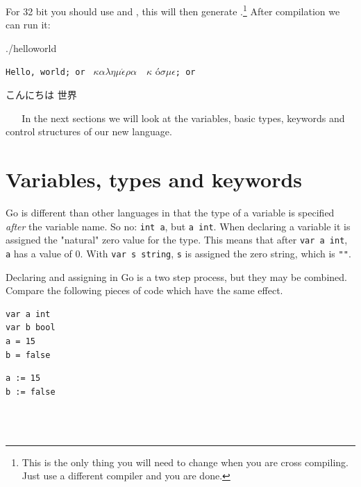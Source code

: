 For 32 bit you should use  and , this will then
generate .\footnote{This is the only thing you will
need to change when you are cross compiling. Just use a different
compiler and you are done.}
After compilation we can run it:
\begin{display}
\pr ./helloworld
\end{display}\texttt{Hello, world; or }%
\begin{math}\kappa\alpha\lambda\eta\mu\acute{\epsilon}\rho\alpha\hspace{1em}\kappa\end{math}%
\'o\begin{math} \sigma\mu\epsilon\end{math}\texttt{; or }\begin{cjk}こんにちは 世界\end{cjk}
\ \newline
\ \newline
In the next sections we will look at the variables, basic types,
keywords and  control structures of our new language. 


\section{Variables, types and keywords}
Go is different than other languages in that the type of a variable
is specified \emph{after} the variable name. So no: 
\lstinline{int a}, but \lstinline{a int}. When declaring a variable it
is assigned the "natural" zero value for the type. This means that after
\lstinline{var a int}, \lstinline{a} has a value of $0$. With
\lstinline{var s string}, \lstinline{s} is assigned the zero string,
which is \lstinline{""}. 

Declaring and assigning in Go is a two step process, but they may
be combined. Compare the following pieces of code which have
the same effect.

\begin{minipage}{.5\textwidth}
\begin{lstlisting}[linewidth=.5\textwidth,caption=Declaration with \texttt{=}]
var a int
var b bool
a = 15
b = false
\end{lstlisting}
\hfill
\end{minipage}
\begin{minipage}{.5\textwidth}
\begin{lstlisting}[linewidth=.5\textwidth,caption=Short declaration with \texttt{:=}]
a := 15
b := false
\end{lstlisting}
\ \\
\ \\
\hfill
\end{minipage}

